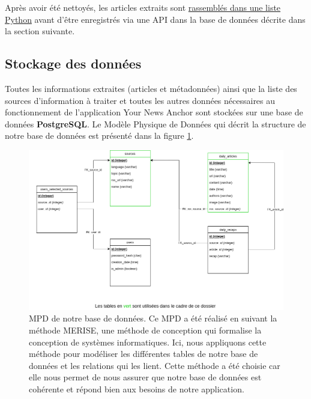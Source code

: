 \documentclass[french]{article}
\begin{document}
    Après avoir été nettoyés, les articles extraits sont \href{https://github.com/vinpap/your_news_anchor/blob/5deffe3be7453d998b2377548902759869e1926d/extract_articles.py#L51}{rassemblés dans une liste Python} avant d'être enregistrés via une API dans la base de données décrite dans la section suivante.

    \subsection{Stockage des données}

    Toutes les informations extraites (articles et métadonnées) ainsi que la liste des sources d'information à traiter et toutes les autres données nécessaires au fonctionnement de l'application Your News Anchor sont stockées sur une base de données \textbf{PostgreSQL}. Le Modèle Physique de Données qui décrit la structure de notre base de données est présenté dans la figure \ref{fig:mpd}. 


    \begin{figure}[h]
        \includegraphics[width=12cm]{mpd_e1}
        \centering
        \caption{MPD de notre base de données. Ce MPD a été réalisé en suivant la méthode MERISE, une méthode de conception qui formalise la conception de systèmes informatiques. Ici, nous appliquons cette méthode pour modéliser les différentes tables de notre base de données et les relations qui les lient. Cette méthode a été choisie car elle nous permet de nous assurer que notre base de données est cohérente et répond bien aux besoins de notre application.}
        \label{fig:mpd}
        \centering
    \end{figure}
\end{document}
